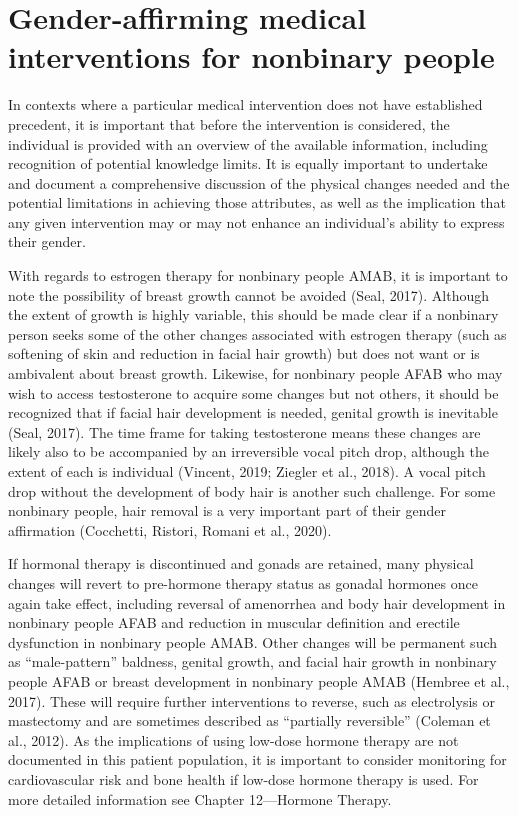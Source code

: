\documentclass[
]{book}
\begin{document}
\hypertarget{gender-affirming-medical-interventions-for-nonbinary-people}{%
\section*{Gender-affirming medical interventions for nonbinary people}\label{gender-affirming-medical-interventions-for-nonbinary-people}}

In contexts where a particular medical intervention does not have established precedent, it is
important that before the intervention is considered, the individual is provided with an overview
of the available information, including recognition
of potential knowledge limits. It is equally important to undertake and document a comprehensive
discussion of the physical changes needed and
the potential limitations in achieving those
attributes, as well as the implication that any
given intervention may or may not enhance an
individual's ability to express their gender.

With regards to estrogen therapy for nonbinary
people AMAB, it is important to note the possibility of breast growth cannot be avoided (Seal,
2017). Although the extent of growth is highly
variable, this should be made clear if a nonbinary
person seeks some of the other changes associated
with estrogen therapy (such as softening of skin
and reduction in facial hair growth) but does not
want or is ambivalent about breast growth.
Likewise, for nonbinary people AFAB who may
wish to access testosterone to acquire some changes
but not others, it should be recognized that if
facial hair development is needed, genital growth
is inevitable (Seal, 2017). The time frame for taking testosterone means these changes are likely
also to be accompanied by an irreversible vocal
pitch drop, although the extent of each is individual (Vincent, 2019; Ziegler et al., 2018). A vocal
pitch drop without the development of body hair
is another such challenge. For some nonbinary
people, hair removal is a very important part of
their gender affirmation (Cocchetti, Ristori,
Romani et al., 2020).

If hormonal therapy is discontinued and gonads
are retained, many physical changes will revert
to pre-hormone therapy status as gonadal hormones once again take effect, including reversal
of amenorrhea and body hair development in
nonbinary people AFAB and reduction in muscular definition and erectile dysfunction in nonbinary people AMAB. Other changes will be
permanent such as ``male-pattern'' baldness, genital growth, and facial hair growth in nonbinary
people AFAB or breast development in nonbinary
people AMAB (Hembree et al., 2017). These will
require further interventions to reverse, such as
electrolysis or mastectomy and are sometimes
described as ``partially reversible'' (Coleman et al.,
2012). As the implications of using low-dose hormone therapy are not documented in this patient
population, it is important to consider monitoring
for cardiovascular risk and bone health if low-dose
hormone therapy is used. For more detailed
information see Chapter 12---Hormone Therapy.
\end{document}
